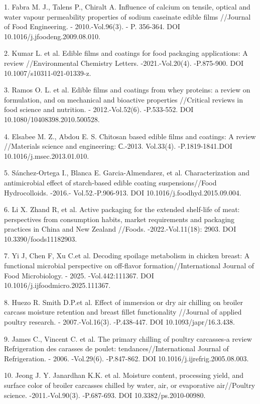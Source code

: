 \begin{refs}
1. Fabra M. J., Talens P., Chiralt A. Influence of calcium on tensile,
optical and water vapour permeability properties of sodium caseinate
edible films //Journal of Food Engineering. - 2010.-Vol.96(3). - P.
356-364. DOI 10.1016/j.jfoodeng.2009.08.010.

2. Kumar L. et al. Edible films and coatings for food packaging
applications: A review //Environmental Chemistry Letters.
-2021.-Vol.20(4). -P.875-900. DOI 10.1007/s10311-021-01339-z.

3. Ramos O. L. et al. Edible films and coatings from whey proteins: a
review on formulation, and on mechanical and bioactive properties
//Critical reviews in food science and nutrition. - 2012.-Vol.52(6).
-P.533-552. DOI 10.1080/10408398.2010.500528.

4. Elsabee M. Z., Abdou E. S. Chitosan based edible films and coatings:
A review //Materials science and engineering: С.-2013. Vol.33(4).
-P.1819-1841.DOI 10.1016/j.msec.2013.01.010.

5. Sánchez-Ortega I., Blanca E. Garcia-Almendarez, et al.
Characterization and antimicrobial effect of starch-based edible coating
suspensions//Food Hydrocolloids. -2016.- Vol.52.-P.906-913. DOI
10.1016/j.foodhyd.2015.09.004.

6. Li X. Zhand R, et al. Active packaging for the extended shelf-life of
meat: perspectives from consumption habits, market requirements and
packaging practices in China and New Zealand //Foods. -2022.-Vol.11(18):
2903. DOI 10.3390/foods11182903.

7. Yi J, Chen F, Xu C.et al. Decoding spoilage metabolism in chicken
breast: A functional microbial perspective on off-flavor
formation//International Journal of Food Microbiology. -
2025. -Vol.442:111367. DOI 10.1016/j.ijfoodmicro.2025.111367.

8. Huezo R. Smith D.P.et al. Effect of immersion or dry air chilling on
broiler carcass moisture retention and breast fillet functionality
//Journal of applied poultry research. - 2007.-Vol.16(3). -P.438-447.
DOI 10.1093/japr/16.3.438.

9. James C., Vincent C. et al. The primary chilling of poultry
carcasses-a review Refrigeration des carasses de poulet:
tendances//International Journal of Refrigeration. - 2006. -Vol.29(6).
-P.847-862. DOI 10.1016/j.ijrefrig.2005.08.003.

10. Jeong J. Y. Janardhan K.K. et al. Moisture content, processing
yield, and surface color of broiler carcasses chilled by water, air, or
evaporative air//Poultry science. -2011.-Vol.90(3). -P.687-693. DOI
10.3382/ps.2010-00980.


\end{refs}
